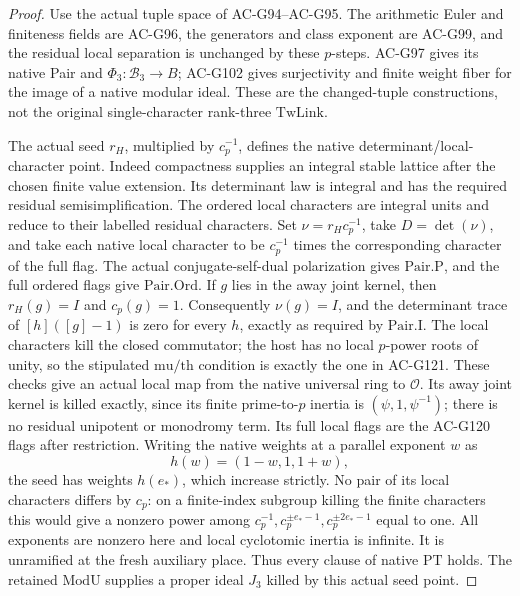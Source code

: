 \begin{proof}
Use the actual tuple space of AC-G94--AC-G95.
The arithmetic Euler and finiteness fields are AC-G96,
the generators and class exponent are AC-G99, and the
residual local separation is unchanged by these \(p\)-steps.
AC-G97 gives its native Pair and
\(\Phi_3:\mathcal B_3\to B\); AC-G102 gives surjectivity
and finite weight fiber for the image of a native modular
ideal.  These are the changed-tuple constructions, not
the original single-character rank-three \(\mathrm{TwLink}\).

The actual seed \(r_H\), multiplied by \(c_p^{-1}\),
defines the native determinant/local-character point.
Indeed compactness supplies an integral stable lattice after
the chosen finite value extension.  Its determinant law is
integral and has the required residual semisimplification.
The ordered local characters are integral units and reduce
to their labelled residual characters.  Set
\(\nu=r_Hc_p^{-1}\), take \(D=\det(\nu)\), and take each
native local character to be \(c_p^{-1}\) times the
corresponding character of the full flag.
The actual conjugate-self-dual polarization gives
\(\mathrm{Pair.P}\), and the full ordered flags give
\(\mathrm{Pair.Ord}\).  If \(g\) lies in the away joint
kernel, then \(r_H(g)=I\) and \(c_p(g)=1\).
Consequently \(\nu(g)=I\), and the determinant trace
of \([h]([g]-1)\) is zero for every \(h\), exactly
as required by \(\mathrm{Pair.I}\).
The local characters kill the closed commutator; the host
has no local \(p\)-power roots of unity, so the stipulated
\(\mathrm{mu}/\mathrm{th}\) condition is exactly the one
in AC-G121.  These checks give an actual local map from
the native universal ring to \(\mathcal O\).
Its away joint kernel is killed exactly, since its
finite prime-to-\(p\) inertia is
\((\psi,1,\psi^{-1})\); there is no residual unipotent
or monodromy term.  Its full local flags are the
AC-G120 flags after restriction.
Writing the native weights at a parallel exponent \(w\) as
\[
                         h(w)=(1-w,1,1+w),
 \tag{AM.17}
\]
the seed has weights \(h(e_*)\), which increase strictly.
No pair of its local characters
differs by \(c_p\): on a finite-index subgroup killing
the finite characters this would give a nonzero power
among \(c_p^{-1},c_p^{\pm e_*-1},c_p^{\pm2e_*-1}\) equal
to one.  All exponents are nonzero here and local
cyclotomic inertia is infinite.  It is unramified at
the fresh auxiliary place.
Thus every clause of native \(\mathrm{PT}\) holds.
The retained \(\mathrm{ModU}\) supplies a proper ideal
\(J_3\) killed by this actual seed point.


\end{proof}
